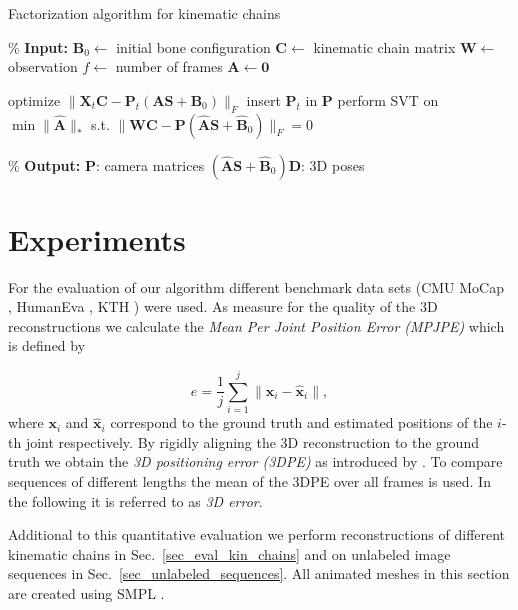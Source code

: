 \documentclass[10pt,letterpaper]{article}
\begin{document}
\begin{algorithm}
	\caption{Factorization algorithm for kinematic chains}
	\label{alg_alternating}
	\begin{algorithmic}
		\STATE \% \textbf{Input:}
		\STATE $\bm{B}_0 \gets$ initial bone configuration
		\STATE $\bm{C} \gets$ kinematic chain matrix
		\STATE $\bm{W} \gets$ observation
		\STATE $f \gets$ number of frames
		\STATE $\bm{A} \gets \bm{0}$ 
		\STATE 
		
		\STATE optimize $\| \bm{X}_t \bm{C} - \bm{P}_t(\bm{AS}+\bm{B}_0) \|_F$
		\STATE insert $\bm{P}_t$ in $\bm{P}$
		\ENDFOR
		\STATE perform SVT on 
		\STATE \hspace{\algorithmicindent} $\min\|\bm{\hat{A}}\|_*$ s.t. $\| \bm{W}\bm{C}-\bm{P}(\bm{\hat{A}}\bm{S}+\bm{\hat{B}}_0) \|_F=0$
		
		\ENDWHILE
		\STATE 
		\STATE \% \textbf{Output:}
		\STATE $\bm{P}$: camera matrices 
		\STATE $(\bm{\hat{A}}\bm{S}+\bm{\hat{B}}_0)\bm{D}$: 3D poses
	\end{algorithmic}
\end{algorithm}

\section{Experiments}
For the evaluation of our algorithm different benchmark data sets (CMU MoCap \cite{cmumocap}, HumanEva \cite{humaneva}, KTH \cite{kazemi2013multi}) were used. As measure for the quality of the 3D reconstructions we calculate the \textit{Mean Per Joint Position Error (MPJPE)} \cite{Ionescu14} which is defined by

\begin{equation}
e = \frac{1}{j} \sum_{i=1}^{j} \| \bm{x}_i - \hat{\bm{x}}_i \|
,
\end{equation}
where $\bm{x}_i$ and $\hat{\bm{x}}_i$ correspond to the ground truth and estimated positions of the $i$-th joint respectively. By rigidly aligning the 3D reconstruction to the ground truth we obtain the \textit{3D positioning error (3DPE)} as introduced by \cite{SimoSerraRATM12}. To compare sequences of different lengths the mean of the 3DPE over all frames is used. In the following it is referred to as \textit{3D error}.

Additional to this quantitative evaluation we perform reconstructions of different kinematic chains in Sec.~\ref{sec_eval_kin_chains} and on unlabeled image sequences in Sec.~\ref{sec_unlabeled_sequences}. All animated meshes in this section are created using SMPL \cite{SMPL2015}.
\end{document}
